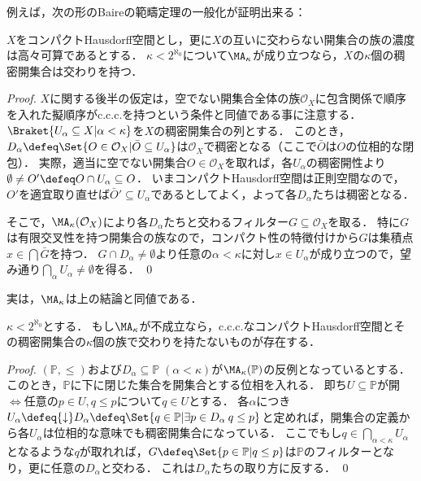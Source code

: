 \documentclass[a4j,leqno]{ltjsarticle}
\begin{document}
例えば，次の形のBaireの範疇定理の一般化が証明出来る：
\begin{theorem}
 $X$をコンパクトHausdorff空間とし，更に$X$の互いに交わらない開集合の族の濃度は高々可算であるとする．
 $\kappa < 2^{\aleph_0}$について$\MA_{\kappa}$が成り立つなら，$X$の$\kappa$個の稠密開集合は交わりを持つ．
\end{theorem}
\begin{proof}
 $X$に関する後半の仮定は，空でない開集合全体の族$\mathcal{O}_X$に包含関係で順序を入れた擬順序がc.c.c.を持つという条件と同値である事に注意する．
 $\Braket{U_\alpha \subseteq X | \alpha < \kappa}$を$X$の稠密開集合の列とする．
 このとき，$D_\alpha \defeq \Set{ O \in \mathcal{O}_X | \bar{O} \subseteq U_\alpha}$は$\mathcal{O}_X$で稠密となる（ここで$\bar{O}$は$O$の位相的な閉包）．
 実際，適当に空でない開集合$O \in \mathcal{O}_X$を取れば，各$U_\alpha$の稠密開性より$\emptyset \neq O' \defeq O \cap U_\alpha \subseteq O$．
 いまコンパクトHausdorff空間は正則空間なので，$O'$を適宜取り直せば$\bar{O}' \subseteq U_\alpha$であるとしてよく，よって各$D_\alpha$たちは稠密となる．

 そこで，$\MA_\kappa(\mathcal{O}_X)$により各$D_\alpha$たちと交わるフィルター$G \subseteq \mathcal{O}_X$を取る．
 特に$G$は有限交叉性を持つ開集合の族なので，コンパクト性の特徴付けから$G$は集積点$x \in \bigcap \bar{G}$を持つ．
 $G \cap D_\alpha \neq \emptyset$より任意の$\alpha < \kappa$に対し$x \in U_\alpha$が成り立つので，望み通り$\bigcap_\alpha U_\alpha \neq \emptyset$を得る． \qed
\end{proof}

実は，$\MA_\kappa$は上の結論と同値である．

\begin{theorem}
 $\kappa < 2^{\aleph_0}$とする．
 もし$\MA_{\kappa}$が不成立なら，c.c.c.なコンパクトHausdorff空間とその稠密開集合の$\kappa$個の族で交わりを持たないものが存在する．
\end{theorem}
\begin{proof}
 $(\mathbb{P}, {\leq})$および$D_\alpha \subseteq \mathbb{P}\; (\alpha < \kappa)$が$\MA_\kappa(\mathbb{P})$の反例となっているとする．
 このとき，$\mathbb{P}$に下に閉じた集合を開集合とする位相を入れる．
 即ち$U \subseteq \mathbb{P}$が開$\iff$任意の$p \in U, q \leq p$について$q \in U$とする．
 各$\alpha$につき$U_\alpha \defeq {\downarrow}D_\alpha \defeq \Set{q \in \mathbb{P} | \exists p \in D_\alpha \: q \leq p}$と定めれば，開集合の定義から各$U_\alpha$は位相的な意味でも稠密開集合になっている．
 ここでもし$q \in \bigcap_{\alpha < \kappa} U_\alpha$となるような$q$が取れれば，$G \defeq \Set{p \in \mathbb{P} | q \leq p}$は$\mathbb{P}$のフィルターとなり，更に任意の$D_\alpha$と交わる．
 これは$D_\alpha$たちの取り方に反する． \qed
\end{proof}
\end{document}
